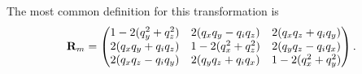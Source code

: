The most common definition for this transformation is
\begin{equation}
\mathbf{R}_m = \begin{pmatrix}
1-2(q_y^2 + q_z^2)		& 2(q_xq_y-q_iq_z)		& 2(q_xq_z + q_iq_y) \\
2(q_xq_y + q_iq_z)		& 1-2(q_x^2 + q_z^2)	& 2(q_yq_z - q_iq_x) \\
2(q_xq_z - q_iq_y)		& 2(q_yq_z+q_iq_x)		& 1-2(q_x^2 + q_y^2)	
\end{pmatrix}.
\end{equation}



